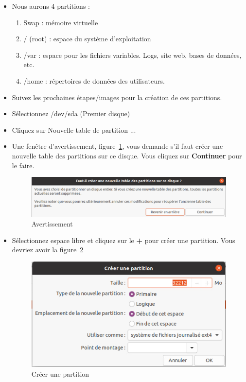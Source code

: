 \begin{itemize}
		
		\item Nous aurons 4 partitions : 
		\begin{enumerate}[label=\arabic*)]
			\item Swap : mémoire virtuelle
			\item / (root) : espace du système d'exploitation
			\item /var : espace pour les fichiers variables. Logs, site web, bases de données, etc.
			\item /home : répertoires de données des utilisateurs.
		\end{enumerate}
		\item Suivez les prochaines étapes/images pour la création de ces partitions.
		\item Sélectionnez /dev/sda (Premier disque)
		\item Cliquez sur  {\color{blue}Nouvelle table de partition ...}
		\item Une fenêtre d'avertissement, figure~\ref{Fig9}, vous demande s'il faut créer une nouvelle table des partitions sur ce disque. Vous cliquez sur \textbf{Continuer} pour le faire.
		\begin{figure}[!htb]
			\centering
			\caption{\label{Fig9}Avertissement}
			\includegraphics[scale=0.49]{images/Capture11}
		\end{figure}
		
		
		\item Sélectionnez espace libre et cliquez sur le  \textbf{+} pour créer une partition. Vous devriez avoir la figure~\ref{Fig10}
		
		\begin{figure}[!htb]
			\centering
			\caption{\label{Fig10}Créer une partition}
			\includegraphics[scale=0.49]{images/Capture12}
		\end{figure}
		

\end{itemize}
